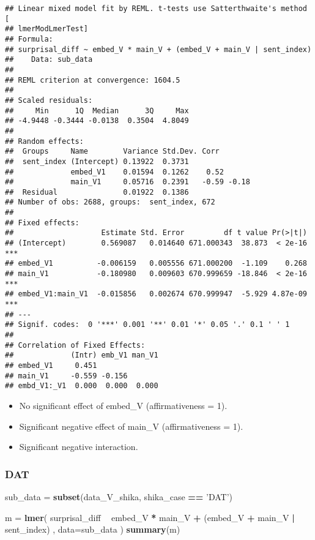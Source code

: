 \documentclass[]{ltjsarticle}
\newenvironment{Shaded}{\begin{snugshade}}{\end{snugshade}}
\newcommand{\KeywordTok}[1]{\textcolor[rgb]{0.13,0.29,0.53}{\textbf{#1}}}
\newcommand{\DataTypeTok}[1]{\textcolor[rgb]{0.13,0.29,0.53}{#1}}
\newcommand{\StringTok}[1]{\textcolor[rgb]{0.31,0.60,0.02}{#1}}
\newcommand{\OperatorTok}[1]{\textcolor[rgb]{0.81,0.36,0.00}{\textbf{#1}}}
\newcommand{\NormalTok}[1]{#1}
\providecommand{\tightlist}{%
  \setlength{\itemsep}{0pt}\setlength{\parskip}{0pt}}
\begin{document}
\begin{verbatim}
## Linear mixed model fit by REML. t-tests use Satterthwaite's method [
## lmerModLmerTest]
## Formula: 
## surprisal_diff ~ embed_V * main_V + (embed_V + main_V | sent_index)
##    Data: sub_data
## 
## REML criterion at convergence: 1604.5
## 
## Scaled residuals: 
##     Min      1Q  Median      3Q     Max 
## -4.9448 -0.3444 -0.0138  0.3504  4.8049 
## 
## Random effects:
##  Groups     Name        Variance Std.Dev. Corr       
##  sent_index (Intercept) 0.13922  0.3731              
##             embed_V1    0.01594  0.1262    0.52      
##             main_V1     0.05716  0.2391   -0.59 -0.18
##  Residual               0.01922  0.1386              
## Number of obs: 2688, groups:  sent_index, 672
## 
## Fixed effects:
##                    Estimate Std. Error         df t value Pr(>|t|)    
## (Intercept)        0.569087   0.014640 671.000343  38.873  < 2e-16 ***
## embed_V1          -0.006159   0.005556 671.000200  -1.109    0.268    
## main_V1           -0.180980   0.009603 670.999659 -18.846  < 2e-16 ***
## embed_V1:main_V1  -0.015856   0.002674 670.999947  -5.929 4.87e-09 ***
## ---
## Signif. codes:  0 '***' 0.001 '**' 0.01 '*' 0.05 '.' 0.1 ' ' 1
## 
## Correlation of Fixed Effects:
##             (Intr) emb_V1 man_V1
## embed_V1     0.451              
## main_V1     -0.559 -0.156       
## embd_V1:_V1  0.000  0.000  0.000
\end{verbatim}

\begin{itemize}
\tightlist
\item
  No significant effect of embed\_V (affirmativeness = 1).
\item
  Significant negative effect of main\_V (affirmativeness = 1).
\item
  Significant negative interaction.
\end{itemize}

\subsubsection{DAT}\label{dat-1}

\begin{Shaded}
\begin{Highlighting}[]
\NormalTok{sub_data =}\StringTok{ }\KeywordTok{subset}\NormalTok{(data_V_shika, shika_case }\OperatorTok{==}\StringTok{ 'DAT'}\NormalTok{)}

\NormalTok{m =}\StringTok{ }\KeywordTok{lmer}\NormalTok{(}
\NormalTok{        surprisal_diff}
            \OperatorTok{~}\StringTok{ }\NormalTok{embed_V }\OperatorTok{*}\StringTok{ }\NormalTok{main_V}
                \OperatorTok{+}\StringTok{ }\NormalTok{(embed_V }\OperatorTok{+}\StringTok{ }\NormalTok{main_V }\OperatorTok{|}\StringTok{ }\NormalTok{sent_index)}
\NormalTok{        ,}
        \DataTypeTok{data=}\NormalTok{sub_data}
\NormalTok{        )}
\KeywordTok{summary}\NormalTok{(m)}
\end{Highlighting}
\end{Shaded}
\end{document}

